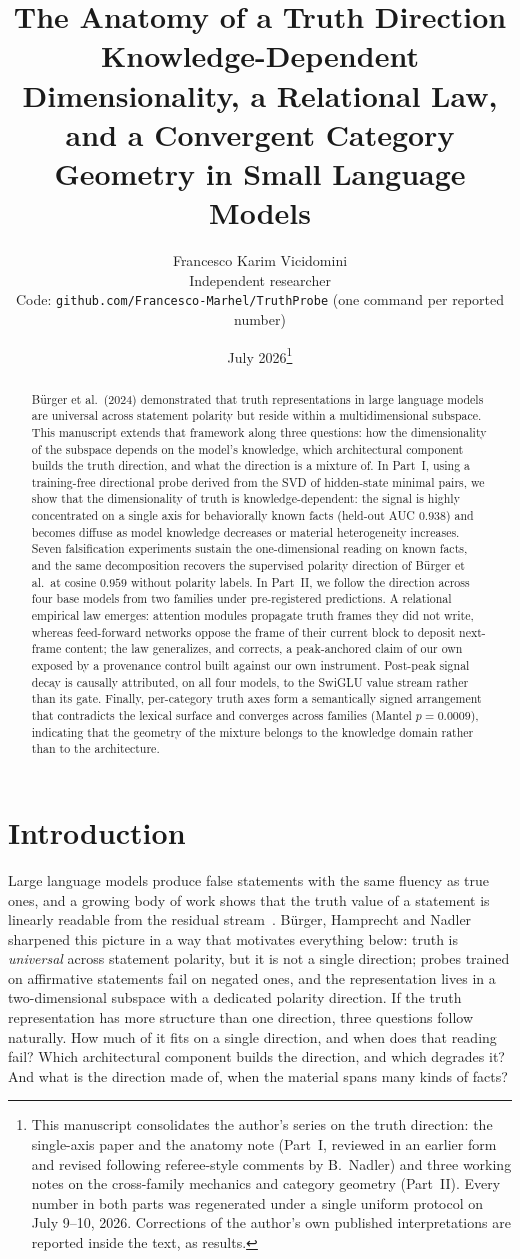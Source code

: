 \documentclass[11pt]{article}
\title{\textbf{The Anatomy of a Truth Direction}\\[2pt]
\large Knowledge-Dependent Dimensionality, a Relational Law,\\
and a Convergent Category Geometry in Small Language Models}
\author{Francesco Karim Vicidomini\\
\small Independent researcher\\
\small Code: \texttt{github.com/Francesco-Marhel/TruthProbe} (one command per reported number)}
\date{July 2026\thanks{This manuscript consolidates the author's series on the
truth direction: the single-axis paper and the anatomy note (Part~I, reviewed
in an earlier form and revised following referee-style comments by B.~Nadler)
and three working notes on the cross-family mechanics and category geometry
(Part~II). Every number in both parts was regenerated under a single uniform
protocol on July 9--10, 2026. Corrections of the author's own published
interpretations are reported inside the text, as results.}}
\begin{document}
\maketitle

\begin{abstract}
B\"urger et al.\ (2024) demonstrated that truth representations in large
language models are universal across statement polarity but reside within a
multidimensional subspace. This manuscript extends that framework along
three questions: how the dimensionality of the subspace depends on the
model's knowledge, which architectural component builds the truth
direction, and what the direction is a mixture of. In Part~I, using a
training-free directional probe derived from the SVD of hidden-state
minimal pairs, we show that the dimensionality of truth is
knowledge-dependent: the signal is highly concentrated on a single axis for
behaviorally known facts (held-out AUC $0.938$) and becomes diffuse as
model knowledge decreases or material heterogeneity increases. Seven
falsification experiments sustain the one-dimensional reading on known
facts, and the same decomposition recovers the supervised polarity
direction of B\"urger et al.\ at cosine $0.959$ without polarity labels. In
Part~II, we follow the direction across four base models from two families
under pre-registered predictions. A relational empirical law emerges:
attention modules propagate truth frames they did not write, whereas
feed-forward networks oppose the frame of their current block to deposit
next-frame content; the law generalizes, and corrects, a peak-anchored
claim of our own exposed by a provenance control built against our own
instrument. Post-peak signal decay is causally attributed, on all four
models, to the SwiGLU value stream rather than its gate. Finally,
per-category truth axes form a semantically signed arrangement that
contradicts the lexical surface and converges across families
(Mantel $p = 0.0009$), indicating that the geometry of the mixture belongs
to the knowledge domain rather than to the architecture.
\end{abstract}

\section{Introduction}

Large language models produce false statements with the same fluency as
true ones, and a growing body of work shows that the truth value of a
statement is linearly readable from the residual
stream~\cite{burns2023,marks2024,li2023,zou2023}. B\"urger, Hamprecht and
Nadler~\cite{burger2024} sharpened this picture in a way that motivates
everything below: truth is \emph{universal} across statement polarity, but
it is not a single direction; probes trained on affirmative statements fail
on negated ones, and the representation lives in a two-dimensional subspace
with a dedicated polarity direction. If the truth representation has more
structure than one direction, three questions follow naturally. How much of
it fits on a single direction, and when does that reading fail? Which
architectural component builds the direction, and which degrades it? And
what is the direction made of, when the material spans many kinds of facts?
\end{document}
